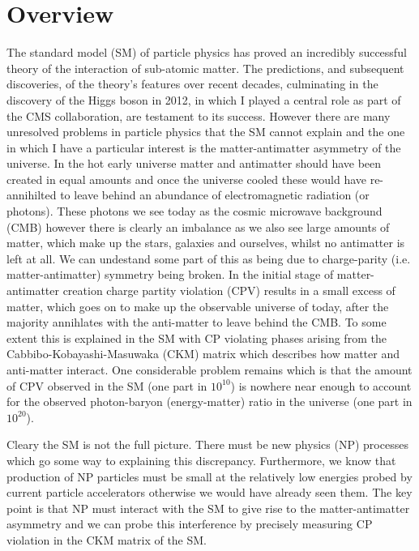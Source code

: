 \documentclass[a4paper, 10pt]{article}
\begin{document}
\section*{Overview}

The standard model (SM) of particle physics has proved an incredibly successful theory of the interaction of sub-atomic matter.
The predictions, and subsequent discoveries, of the theory's features over recent decades, culminating in the discovery of the Higgs boson in
2012, in which I played a central role as part of the CMS collaboration, are testament to its success. However there are many unresolved problems
in particle physics that the SM cannot explain and the one in which I have a particular interest is the matter-antimatter asymmetry of the universe.
In the hot early universe matter and antimatter should have been created in equal amounts and once the universe cooled these would have
re-annihilted to leave behind an abundance of electromagnetic radiation (or photons). These photons we see today as the cosmic microwave background (CMB) however there
is clearly an imbalance as we also see large amounts of matter, which make up the stars, galaxies and ourselves, whilst no antimatter is left at all. We can undestand some
part of this as being due to charge-parity (i.e. matter-antimatter) symmetry being broken. In the initial stage of matter-antimatter creation charge
partity violation (CPV) results in a small excess of matter, which goes on to make up the observable universe of today, after the majority annihlates with
the anti-matter to leave behind the CMB. To some extent this is explained in the SM with CP violating phases arising from the Cabbibo-Kobayashi-Masuwaka (CKM)
matrix which describes how matter and anti-matter interact. One considerable problem remains which is that the amount of CPV observed in the SM (one part in $10^{10}$) is
nowhere near enough to account for the observed photon-baryon (energy-matter) ratio in the universe (one part in $10^{20}$).

Cleary the SM is not the full picture. There must be new physics (NP) processes which go some way to explaining this discrepancy. Furthermore, we know that production
of NP particles must be small at the relatively low energies probed by current particle accelerators otherwise we would have already seen them. The key point is that
NP must interact with the SM to give rise to the matter-antimatter asymmetry and we can probe this interference by precisely measuring CP violation in the CKM matrix
of the SM.
\end{document}
